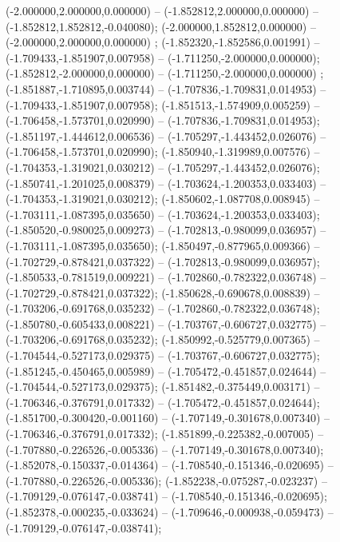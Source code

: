  (-2.000000,2.000000,0.000000) -- (-1.852812,2.000000,0.000000) -- (-1.852812,1.852812,-0.040080);
 (-2.000000,1.852812,0.000000) -- (-2.000000,2.000000,0.000000) ;
 (-1.852320,-1.852586,0.001991) -- (-1.709433,-1.851907,0.007958) -- (-1.711250,-2.000000,0.000000);
 (-1.852812,-2.000000,0.000000) -- (-1.711250,-2.000000,0.000000) ;
 (-1.851887,-1.710895,0.003744) -- (-1.707836,-1.709831,0.014953) -- (-1.709433,-1.851907,0.007958);
 (-1.851513,-1.574909,0.005259) -- (-1.706458,-1.573701,0.020990) -- (-1.707836,-1.709831,0.014953);
 (-1.851197,-1.444612,0.006536) -- (-1.705297,-1.443452,0.026076) -- (-1.706458,-1.573701,0.020990);
 (-1.850940,-1.319989,0.007576) -- (-1.704353,-1.319021,0.030212) -- (-1.705297,-1.443452,0.026076);
 (-1.850741,-1.201025,0.008379) -- (-1.703624,-1.200353,0.033403) -- (-1.704353,-1.319021,0.030212);
 (-1.850602,-1.087708,0.008945) -- (-1.703111,-1.087395,0.035650) -- (-1.703624,-1.200353,0.033403);
 (-1.850520,-0.980025,0.009273) -- (-1.702813,-0.980099,0.036957) -- (-1.703111,-1.087395,0.035650);
 (-1.850497,-0.877965,0.009366) -- (-1.702729,-0.878421,0.037322) -- (-1.702813,-0.980099,0.036957);
 (-1.850533,-0.781519,0.009221) -- (-1.702860,-0.782322,0.036748) -- (-1.702729,-0.878421,0.037322);
 (-1.850628,-0.690678,0.008839) -- (-1.703206,-0.691768,0.035232) -- (-1.702860,-0.782322,0.036748);
 (-1.850780,-0.605433,0.008221) -- (-1.703767,-0.606727,0.032775) -- (-1.703206,-0.691768,0.035232);
 (-1.850992,-0.525779,0.007365) -- (-1.704544,-0.527173,0.029375) -- (-1.703767,-0.606727,0.032775);
 (-1.851245,-0.450465,0.005989) -- (-1.705472,-0.451857,0.024644) -- (-1.704544,-0.527173,0.029375);
 (-1.851482,-0.375449,0.003171) -- (-1.706346,-0.376791,0.017332) -- (-1.705472,-0.451857,0.024644);
 (-1.851700,-0.300420,-0.001160) -- (-1.707149,-0.301678,0.007340) -- (-1.706346,-0.376791,0.017332);
 (-1.851899,-0.225382,-0.007005) -- (-1.707880,-0.226526,-0.005336) -- (-1.707149,-0.301678,0.007340);
 (-1.852078,-0.150337,-0.014364) -- (-1.708540,-0.151346,-0.020695) -- (-1.707880,-0.226526,-0.005336);
 (-1.852238,-0.075287,-0.023237) -- (-1.709129,-0.076147,-0.038741) -- (-1.708540,-0.151346,-0.020695);
 (-1.852378,-0.000235,-0.033624) -- (-1.709646,-0.000938,-0.059473) -- (-1.709129,-0.076147,-0.038741);
